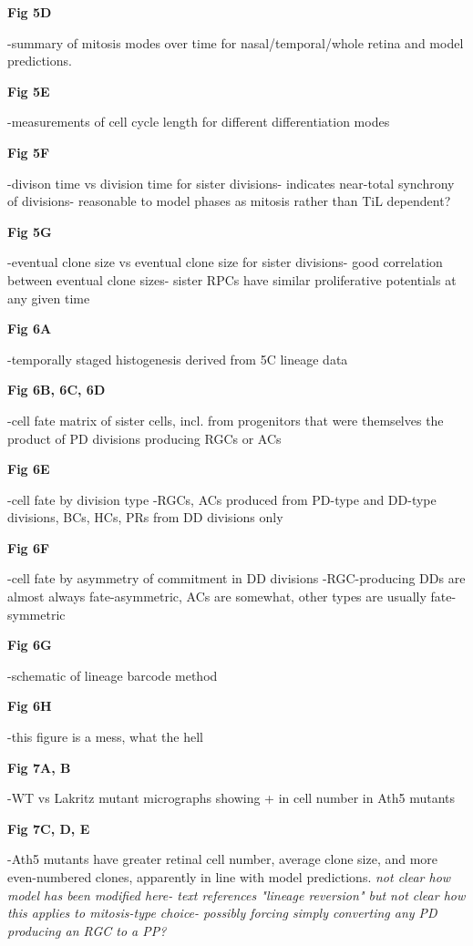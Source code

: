 \documentclass{ut-thesis}
\begin{document}
\textbf{Fig 5D}

-summary of mitosis modes over time for nasal/temporal/whole retina and model predictions.

\textbf{Fig 5E}

-measurements of cell cycle length for different differentiation modes

\textbf{Fig 5F}

-divison time vs division time for sister divisions- indicates near-total synchrony of divisions- reasonable to model phases as mitosis rather than TiL dependent?

\textbf{Fig 5G}

-eventual clone size vs eventual clone size for sister divisions- good correlation between eventual clone sizes- sister RPCs have similar proliferative potentials at any given time

\bigskip

\textbf{Fig 6A}

-temporally staged histogenesis derived from 5C lineage data

\textbf{Fig 6B, 6C, 6D}

-cell fate matrix of sister cells, incl. from progenitors that were themselves the product of PD divisions producing RGCs or ACs

\textbf{Fig 6E}

-cell fate by division type
-RGCs, ACs produced from PD-type and DD-type divisions, BCs, HCs, PRs from DD divisions only

\textbf{Fig 6F}

-cell fate by asymmetry of commitment in DD divisions
-RGC-producing DDs are almost always fate-asymmetric, ACs are somewhat, other types are usually fate-symmetric

\textbf{Fig 6G}

-schematic of lineage barcode method

\textbf{Fig 6H}

-this figure is a mess, what the hell

\bigskip

\textbf{Fig 7A, B}

-WT vs Lakritz mutant micrographs showing + in cell number in Ath5 mutants

\textbf{Fig 7C, D, E}

-Ath5 mutants have greater retinal cell number, average clone size, and more even-numbered clones, apparently in line with model predictions. \textit{not clear how model has been modified here- text references "lineage reversion" but not clear how this applies to mitosis-type choice- possibly forcing simply converting any PD producing an RGC to a PP?}
\end{document}
